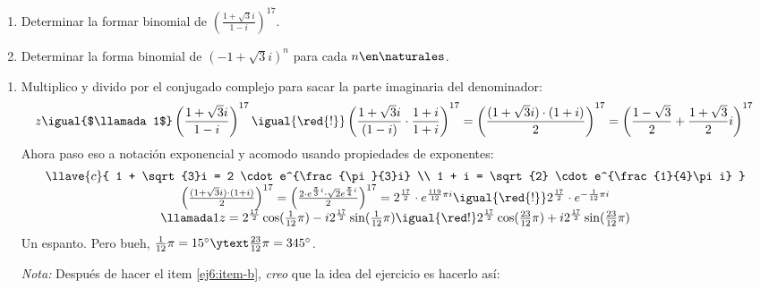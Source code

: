 \begin{enunciado}{\ejercicio}
  \begin{enumerate}[label=\alph*)]
    \item Determinar la formar binomial de
          $ \left(\frac{1 + \sqrt{3} i }{1 - i} \right)^{17}$.

    \item Determinar la forma binomial de
          $(-1 + \sqrt{3}i)^n$ para cada $n \en \naturales$.
  \end{enumerate}
\end{enunciado}

\begin{enumerate}[label=\alph*)]
  \item  Multiplico y divido por el conjugado complejo para sacar la parte imaginaria del denominador:
        $$
          z \igual{$\llamada1$} \left(\frac{1 + \sqrt{3} i }{1 - i} \right)^{17} \igual{\red{!}}
          \left(\frac{1 + \sqrt{3} i }{(1 - i)}\cdot \frac{1+i}{1+i} \right)^{17} =
          \left( \frac{(1 + \sqrt{3} i) \cdot (1+i) }{2} \right)^{17} =
          \left( \frac{1 - \sqrt{3}}{2} + \frac{1+\sqrt{3}}{2}i \right)^{17}
          \\
        $$
        Ahora paso eso a notación exponencial y acomodo usando propiedades de exponentes:
        $$
          \begin{array}{c}
            \llave{c}{
            1 + \sqrt{3}i = 2 \cdot e^{\frac{\pi}{3}i}     \\
              1 + i = \sqrt{2} \cdot e^{\frac{1}{4}\pi i}
            }                                              \\
            \left( \frac{(1 + \sqrt{3} i) \cdot (1+i) }{2} \right)^{17} =
            \left( \frac{{2 \cdot e^{\frac{\pi}{3}i} } \cdot \sqrt{2} e^{\frac{\pi}{4}i}}{2} \right)^{17} =
            2^{\frac{17}{2}} \cdot  e^{\frac{119}{12}\pi i}  \igual{\red{!}}
            2^{\frac{17}{2}} \cdot  e^{-\frac{1}{12}\pi i} \\
            \llamada1 z =
            2^{\frac{17}{2}}  \cos(\frac{1}{12} \pi) - i 2^{\frac{17}{2}} \sin(\frac{1}{12} \pi)
            \igual{\red!}
            2^{\frac{17}{2}}  \cos(\frac{23}{12} \pi) + i 2^{\frac{17}{2}} \sin(\frac{23}{12} \pi)
          \end{array}
        $$
        Un espanto. Pero bueh, $\frac{1}{12}\pi = 15^\circ \ytext \frac{23}{12} \pi = 345^\circ$.

        \medskip

        \textit{Nota:} Después de hacer el item \ref{ej6:item-b}, \textit{creo} que la idea del ejercicio es hacerlo así:


\end{enumerate}
